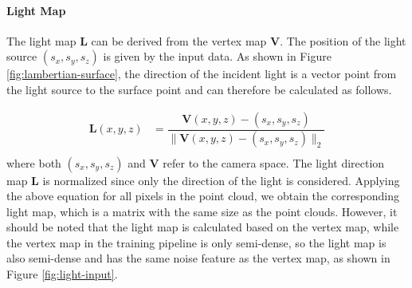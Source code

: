 \paragraph{Light Map}
The light map $ \textbf{L} $ can be derived from the vertex map $ \textbf{V} $. The position of the light source $ (s_x, s_y, s_z) $ is given by the input data. As shown in Figure \ref{fig:lambertian-surface}, the direction of the incident light is a vector point from the light source to the surface point and can therefore be calculated as follows.

\begin{equation}\label{light-direction}
	\begin{array}{ll}
		\textbf{L}(x,y,z)&= \dfrac{\textbf{V}(x,y,z)-(s_x,s_y, s_z)}{\|\textbf{V}(x,y,z)-(s_x,s_y, s_z)\|_2}\\ 
	\end{array}
\end{equation}
where both $ (s_x, s_y, s_z) $ and $ \textbf{V} $ refer to the camera space. The light direction map $ \textbf{L} $ is normalized since only the direction of the light is considered. Applying the above equation for all pixels in the point cloud, we obtain the corresponding light map, which is a matrix with the same size as the point clouds. However, it should be noted that the light map is calculated based on the vertex map, while the vertex map in the training pipeline is only semi-dense, so the light map is also semi-dense and has the same noise feature as the vertex map, as shown in Figure \ref{fig:light-input}. 

